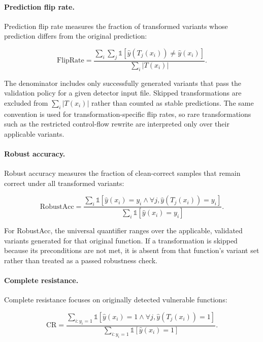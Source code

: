 \documentclass[a4paper,fleqn]{cas-dc}
\begin{document}
\paragraph{Prediction flip rate.}
Prediction flip rate measures the fraction of transformed variants whose
prediction differs from the original prediction:

\begin{equation}
\text{FlipRate} =
\frac{\sum_i \sum_j \mathbb{1}[\hat{y}(T_j(x_i)) \neq \hat{y}(x_i)]}
{\sum_i |T(x_i)|}.
\end{equation}

The denominator includes only successfully generated variants that pass the
validation policy for a given detector input file. Skipped transformations are
excluded from $\sum_i |T(x_i)|$ rather than counted as stable predictions. The
same convention is used for transformation-specific flip rates, so rare
transformations such as the restricted control-flow rewrite are interpreted
only over their applicable variants.

\paragraph{Robust accuracy.}
Robust accuracy measures the fraction of clean-correct samples that remain
correct under all transformed variants:

\begin{equation}
\text{RobustAcc} =
\frac{\sum_i \mathbb{1}[\hat{y}(x_i)=y_i \land \forall j,\hat{y}(T_j(x_i))=y_i]}
{\sum_i \mathbb{1}[\hat{y}(x_i)=y_i]}.
\end{equation}

For RobustAcc, the universal quantifier ranges over the applicable, validated
variants generated for that original function. If a transformation is skipped
because its preconditions are not met, it is absent from that function's
variant set rather than treated as a passed robustness check.

\paragraph{Complete resistance.}
Complete resistance focuses on originally detected vulnerable functions:

\begin{equation}
\text{CR} =
\frac{\sum_{i:y_i=1} \mathbb{1}[\hat{y}(x_i)=1 \land \forall j,\hat{y}(T_j(x_i))=1]}
{\sum_{i:y_i=1} \mathbb{1}[\hat{y}(x_i)=1]}.
\end{equation}
\end{document}

